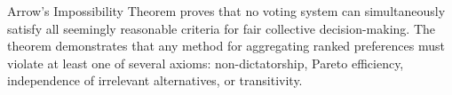Arrow's Impossibility Theorem proves that no voting system can simultaneously satisfy all seemingly reasonable criteria for fair collective decision-making. The theorem demonstrates that any method for aggregating ranked preferences must violate at least one of several axioms: non-dictatorship, Pareto efficiency, independence of irrelevant alternatives, or transitivity.
